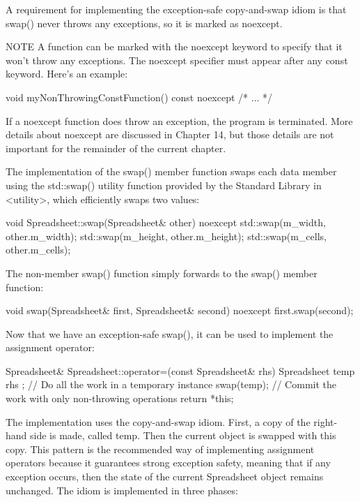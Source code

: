 A requirement for implementing the exception-safe copy-and-swap idiom is that swap() never throws any exceptions, so it is marked as noexcept.

\begin{myNotic}{NOTE}
A function can be marked with the noexcept keyword to specify that it won’t throw any exceptions. The noexcept specifier must appear after any const keyword. Here’s an example:

\begin{cpp}
void myNonThrowingConstFunction() const noexcept { /* ... */ }
\end{cpp}

If a noexcept function does throw an exception, the program is terminated. More details about noexcept are discussed in Chapter 14, but those details are not important for the remainder of the current chapter.
\end{myNotic}

The implementation of the swap() member function swaps each data member using the std::swap() utility function provided by the Standard Library in <utility>, which efficiently swaps two values:

\begin{cpp}
void Spreadsheet::swap(Spreadsheet& other) noexcept
{
    std::swap(m_width, other.m_width);
    std::swap(m_height, other.m_height);
    std::swap(m_cells, other.m_cells);
}
\end{cpp}

The non-member swap() function simply forwards to the swap() member function:

\begin{cpp}
void swap(Spreadsheet& first, Spreadsheet& second) noexcept
{
    first.swap(second);
}
\end{cpp}

Now that we have an exception-safe swap(), it can be used to implement the assignment operator:

\begin{cpp}
Spreadsheet& Spreadsheet::operator=(const Spreadsheet& rhs)
{
    Spreadsheet temp { rhs }; // Do all the work in a temporary instance
    swap(temp); // Commit the work with only non-throwing operations
    return *this;
}
\end{cpp}

The implementation uses the copy-and-swap idiom. First, a copy of the right-hand side is made, called temp. Then the current object is swapped with this copy. This pattern is the recommended way of implementing assignment operators because it guarantees strong exception safety, meaning that if any exception occurs, then the state of the current Spreadsheet object remains unchanged. The idiom is implemented in three phases:

